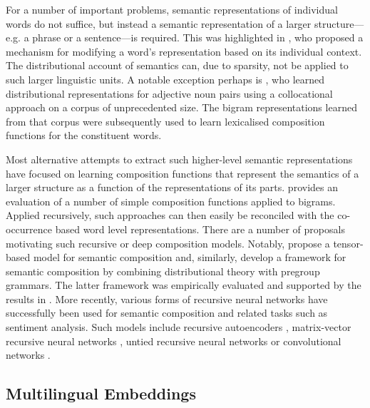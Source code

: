 \documentclass{article} \pdfoutput=1
\begin{document}
For a number of important problems, semantic representations of individual words
do not suffice, but instead a semantic representation of a larger
structure---e.g. a phrase or a sentence---is required.  This was highlighted in
\cite{Erk:2008}, who proposed a mechanism for modifying a word's representation
based on its individual context.  The distributional account of semantics can,
due to sparsity, not be applied to such larger linguistic units.  A notable
exception perhaps is \citet{Baroni:2010}, who learned distributional
representations for adjective noun pairs using a collocational approach on a
corpus of unprecedented size.  The bigram representations learned from that
corpus were subsequently used to learn lexicalised composition functions for the
constituent words.

Most alternative attempts to extract such higher-level semantic representations
have focused on learning composition functions that represent the semantics of a
larger structure as a function of the representations of its parts.
\cite{Mitchell:2008} provides an evaluation of a number of simple composition
functions applied to bigrams.  Applied recursively, such approaches can then
easily be reconciled with the co-occurrence based word level representations.
There are a number of proposals motivating such recursive or deep composition
models.  Notably, \cite{Clark:2007a} propose a tensor-based model for semantic
composition and, similarly, \cite{Coecke:2010} develop a framework for semantic
composition by combining distributional theory with pregroup grammars.  The
latter framework was empirically evaluated and supported by the results in
\cite{Grefenstette:2011}.  More recently, various forms of recursive neural
networks have successfully been used for semantic composition and related tasks
such as sentiment analysis.  Such models include recursive autoencoders
\cite{Socher:2011}, matrix-vector recursive neural networks \cite{Socher:2012},
untied recursive neural networks \cite{Hermann:2013:ACL} or convolutional
networks \cite{Kalchbrenner:2013}.

\subsection{Multilingual Embeddings}
\end{document}
